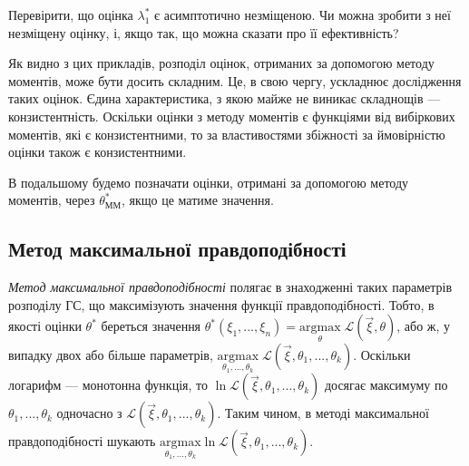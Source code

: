 \begin{exercise}
    Перевірити, що оцінка $\lambda_1^*$ є асимптотично незміщеною. Чи можна зробити з неї незміщену оцінку, і, якщо так, що можна сказати про її ефективність?
\end{exercise}
Як видно з цих прикладів, розподіл оцінок, отриманих за допомогою методу моментів, може бути досить складним. Це, в свою чергу, ускладнює дослідження таких оцінок.
Єдина характеристика, з якою майже не виникає складнощів --- конзистентність. Оскільки оцінки з методу моментів є функціями від вибіркових моментів, які є
конзистентними, то за властивостями збіжності за ймовірністю оцінки також є конзистентними.
\begin{remark}
    В подальшому будемо позначати оцінки, отримані за допомогою методу моментів, через $\theta^*_{\text{ММ}}$, якщо це матиме значення.
\end{remark}
\subsection{Метод максимальної правдоподібності}
\emph{Метод максимальної правдоподібності} полягає в знаходженні таких параметрів розподілу ГС, що максимізують значення функції правдоподібності.
Тобто, в якості оцінки $\theta^*$ береться значення $\theta^*(\xi_1, ..., \xi_n) = \underset{\theta}{\mathrm{argmax}} \;{\mathcal{L}(\vec{\xi}, \theta)}$, або ж, у випадку
двох або більше параметрів, $\underset{\theta_1, ..., \theta_k}{\mathrm{argmax}} \; {\mathcal{L}(\vec{\xi}, \theta_1, ..., \theta_k)}$. Оскільки логарифм --- монотонна функція,
то $\ln {\mathcal{L}(\vec{\xi}, \theta_1, ..., \theta_k)}$ досягає максимуму по $\theta_1, ..., \theta_k$ одночасно з ${\mathcal{L}(\vec{\xi}, \theta_1, ..., \theta_k)}$.
Таким чином, в методі максимальної правдоподібності шукають $\underset{\theta_1, ..., \theta_k}{\mathrm{argmax}} \ln{\mathcal{L}(\vec{\xi}, \theta_1, ..., \theta_k)}$.

